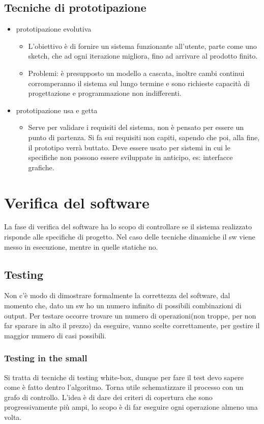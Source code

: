 \documentclass[a4paper,12pt]{report}
\begin{document}
	\subsection{Tecniche di prototipazione}
	\begin{itemize}
		\item prototipazione evolutiva
		\begin{itemize}
			\item L'obiettivo è di fornire un sistema funzionante all'utente, parte come uno sketch, che ad ogni iterazione migliora, fino ad arrivare al prodotto finito.
			\item Problemi: è presupposto un modello a cascata, inoltre cambi continui corromperanno il sistema sul lungo termine e sono richieste capacità di progettazione e programmazione non indifferenti.
		\end{itemize}
		\item prototipazione usa e getta
		\begin{itemize}
			\item Serve per validare i requisiti del sistema, non è pensato per essere un punto di partenza. Si fa sui requisiti non capiti, sapendo che poi, alla fine, il prototipo verrà buttato. Deve essere usato per sistemi in cui le specifiche non possono essere sviluppate in anticipo, es: interfacce grafiche.
		\end{itemize}
	\end{itemize}
	\section{Verifica del software}
	La fase di verifica del software ha lo scopo di controllare se il sistema realizzato risponde alle specifiche di progetto. Nel caso delle tecniche dinamiche il sw viene messo in esecuzione, mentre in quelle statiche no.
	\subsection{Testing}
	Non c’è modo di dimostrare formalmente la correttezza del software, dal momento che, dato un sw ho un numero infinito di possibili combinazioni di output. Per testare occorre trovare un numero di operazioni(non troppe, per non far sparare in alto il prezzo) da eseguire, vanno scelte correttamente, per gestire il maggior numero di casi possibili.
	\subsubsection{Testing in the small}
	Si tratta di tecniche di testing white-box, dunque per fare il test devo sapere come è fatto dentro l’algoritmo.  Torna utile schematizzare il processo con un grafo di controllo. L’idea è di dare dei criteri di copertura che sono progressivamente più ampi, lo scopo è di far eseguire ogni operazione almeno una volta. 
\end{document}
